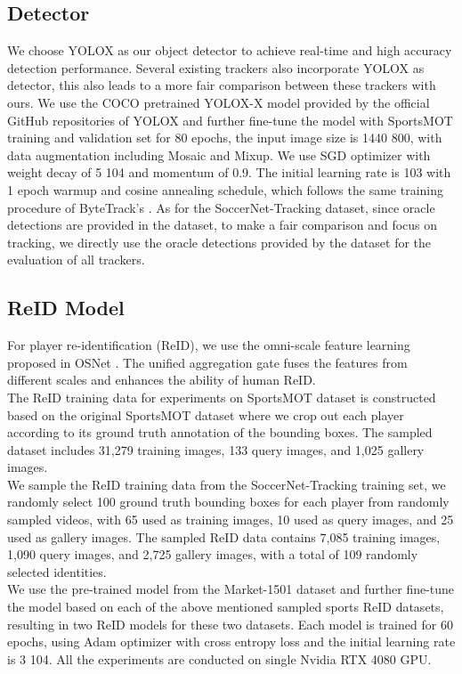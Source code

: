 \documentclass[10pt,twocolumn,letterpaper]{article}
\begin{document}
\subsection{Detector}
We choose YOLOX \cite{YOLOX} as our object detector to achieve real-time and high accuracy detection performance. Several existing trackers \cite{ByteTrack,OCSORT,aharon2022bot,yang2023hard} also incorporate YOLOX as detector, this also leads to a more fair comparison between these trackers with ours. We use the COCO pretrained YOLOX-X model provided by the official GitHub repositories of YOLOX \cite{YOLOX} and further fine-tune the model with SportsMOT training and validation set for 80 epochs, the input image size is 1440  800, with data augmentation including Mosaic and Mixup. We use SGD optimizer with weight decay of 5  104 and momentum of 0.9. The initial learning rate is 103 with 1 epoch warmup and cosine annealing schedule, which follows the same training procedure of ByteTrack's \cite{ByteTrack}. As for the SoccerNet-Tracking dataset, since oracle detections are provided in the dataset, to make a fair comparison and focus on tracking, we directly use the oracle detections provided by the dataset for the evaluation of all trackers.

\subsection{ReID Model}



For player re-identification (ReID), we use the omni-scale feature learning proposed in OSNet \cite{OSNet}. The unified aggregation gate fuses the features from different scales and enhances the ability of human ReID. \\
 The ReID training data for experiments on SportsMOT dataset is constructed based on the original SportsMOT dataset where we crop out each player according to its ground truth annotation of the bounding boxes. The sampled dataset includes 31,279 training images, 133 query images, and 1,025 gallery images. \\
 We sample the ReID training data from the SoccerNet-Tracking training set, we randomly select 100 ground truth bounding boxes for each player from randomly sampled videos, with 65 used as training images, 10 used as query images, and 25 used as gallery images. The sampled ReID data contains 7,085 training images, 1,090 query images, and 2,725 gallery images, with a total of 109 randomly selected identities.\\
 We use the pre-trained model from the Market-1501 dataset \cite{zheng2015scalable} and further fine-tune the model based on each of the above mentioned sampled sports ReID datasets, resulting in two ReID models for these two datasets. Each model is trained for 60 epochs, using Adam optimizer with cross entropy loss and the initial learning rate is 3  104. All the experiments are conducted on single Nvidia RTX 4080 GPU.\\  
\end{document}
